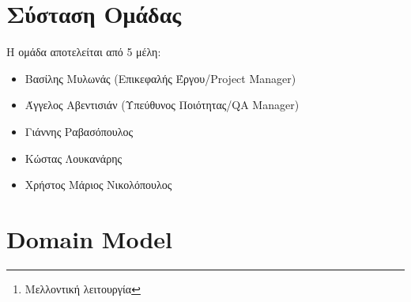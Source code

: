 \documentclass[11pt]{article}
\begin{document}

\newpage

\begin{abstract}
    Ανάπτυξη συστήματος και συνοδεύουσας εφαρμογής για την εύρεση/ενοικίαση
    θέσεων στάθμευσης και την διευκόλυνση συνεπιβίβασης σε κοινές διαδρομές.
    Η εφαρμογή εγκαθισταται σε κινητές συσκευές και παρέχει ζωντανή πληροφόρηση
    αντλώντας πληροφορίες από τους χρήστες, στατιστικά μοντέλα και από δίκτυα
    αισθητήρων\footnote{Μελλοντική λειτουργία} όπου αυτό είναι δυνατό. Η
    εφαρμογή απευθύνεται αμφότερα σε οδηγούς αυτοκινήτων αλλά και σε πεζούς.
    Στόχος είναι η καλύτερη αξιοποίηση του οδικού δικτύου και η μείωση της
    κυκλοφοριακής συμφόρησης σε αστικές περιοχές.
\end{abstract}

\newpage

\tableofcontents

\newpage

\section{Σύσταση Ομάδας}

Η ομάδα αποτελείται από 5 μέλη:

\begin{itemize}
    \item Βασίλης Μυλωνάς (Επικεφαλής Έργου/Project Manager)
    \item Άγγελος Αβεντισιάν (Υπεύθυνος Ποιότητας/QA Manager)
    \item Γιάννης Ραβασόπουλος
    \item Κώστας Λουκανάρης
    \item Χρήστος Μάριος Νικολόπουλος
\end{itemize}

\newpage

\section{Domain Model}
\end{document}
